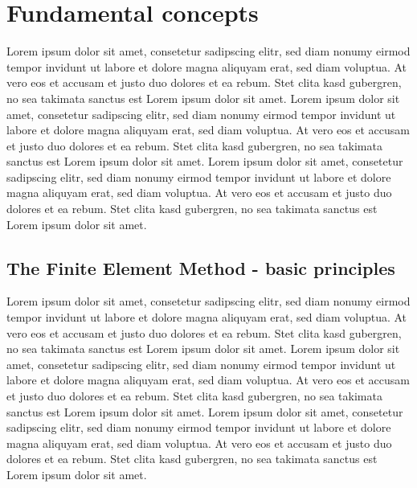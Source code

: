 %
\chapter{Fundamental concepts}
\label{chap:theory}
%
Lorem ipsum dolor sit amet, consetetur sadipscing elitr, sed diam nonumy eirmod 
tempor invidunt ut labore et dolore magna aliquyam erat, sed diam voluptua. At 
vero eos et accusam et justo duo dolores et ea rebum. Stet clita kasd gubergren,
no sea takimata sanctus est Lorem ipsum dolor sit amet. Lorem ipsum dolor sit
amet, consetetur sadipscing elitr, sed diam nonumy eirmod tempor invidunt ut 
labore et dolore magna aliquyam erat, sed diam voluptua. At vero eos et accusam 
et justo duo dolores et ea rebum. Stet clita kasd gubergren, no sea takimata 
sanctus est Lorem ipsum dolor sit amet. Lorem ipsum dolor sit amet, consetetur 
sadipscing elitr, sed diam nonumy eirmod tempor invidunt ut labore et dolore 
magna aliquyam erat, sed diam voluptua. At vero eos et accusam et justo duo 
dolores et ea rebum. Stet clita kasd gubergren, no sea takimata sanctus est
Lorem ipsum dolor sit amet.

%
\section{The Finite Element Method - basic principles}
\label{ssec:FEM}
%
Lorem ipsum dolor sit amet, consetetur sadipscing elitr, sed diam nonumy eirmod 
tempor invidunt ut labore et dolore magna aliquyam erat, sed diam voluptua. At 
vero eos et accusam et justo duo dolores et ea rebum. Stet clita kasd gubergren,
no sea takimata sanctus est Lorem ipsum dolor sit amet. Lorem ipsum dolor sit
amet, consetetur sadipscing elitr, sed diam nonumy eirmod tempor invidunt ut 
labore et dolore magna aliquyam erat, sed diam voluptua. At vero eos et accusam 
et justo duo dolores et ea rebum. Stet clita kasd gubergren, no sea takimata 
sanctus est Lorem ipsum dolor sit amet. Lorem ipsum dolor sit amet, consetetur 
sadipscing elitr, sed diam nonumy eirmod tempor invidunt ut labore et dolore 
magna aliquyam erat, sed diam voluptua. At vero eos et accusam et justo duo 
dolores et ea rebum. Stet clita kasd gubergren, no sea takimata sanctus est
Lorem ipsum dolor sit amet. \cite{Keller1994}


